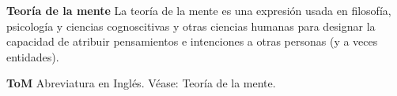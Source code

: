 \noindent \textbf{Teoría de la mente}
\quad La teoría de la mente es una expresión usada en filosofía, psicología y ciencias cognoscitivas y otras ciencias humanas para designar la capacidad de atribuir pensamientos e intenciones a otras personas (y a veces entidades).

\vspace*{12pt}

\noindent \textbf{ToM}
\quad Abreviatura en Inglés. Véase: Teoría de la mente.



\newpage

